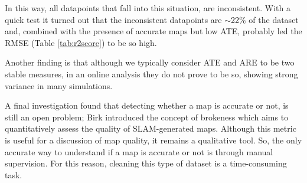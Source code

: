 \noindent
In this way, all datapoints that fall into this situation, are inconsistent. With a quick test it turned out that the inconsistent datapoints are $\sim$22\% of the dataset and, combined with the presence of accurate maps but low ATE, probably led the RMSE (Table \ref{tab:r2score}) to be so high.

Another finding is that although we typically consider ATE and ARE to be two stable measures, in an online analysis they do not prove to be so, showing strong variance in many simulations.

A final investigation found that detecting whether a map is accurate or not, is still an open problem; Birk \cite{birk2010quantitative} introduced the concept of brokeness which aims to quantitatively assess the quality of SLAM-generated maps. Although this metric is useful for a discussion of map quality, it remains a qualitative tool. So, the only accurate way to understand if a map is accurate or not is through manual supervision. For this reason, cleaning this type of dataset is a time-consuming task.

